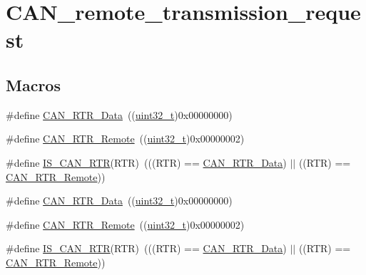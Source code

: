 \hypertarget{group___c_a_n__remote__transmission__request}{}\section{C\+A\+N\+\_\+remote\+\_\+transmission\+\_\+request}
\label{group___c_a_n__remote__transmission__request}
\subsection*{Macros}
\begin{DoxyCompactItemize}
\item 
\#define \hyperlink{group___c_a_n__remote__transmission__request_ga2407c3a8b2cd97bd651143aa959219f1}{C\+A\+N\+\_\+\+R\+T\+R\+\_\+\+Data}~((\hyperlink{_p_e___types_8h_a33594304e786b158f3fb30289278f5af}{uint32\+\_\+t})0x00000000)
\item 
\#define \hyperlink{group___c_a_n__remote__transmission__request_ga42e95ddfb02d88c82de84058fb0fb349}{C\+A\+N\+\_\+\+R\+T\+R\+\_\+\+Remote}~((\hyperlink{_p_e___types_8h_a33594304e786b158f3fb30289278f5af}{uint32\+\_\+t})0x00000002)
\item 
\#define \hyperlink{group___c_a_n__remote__transmission__request_ga3379997ad4da6fc4d7975c52b891bdc0}{I\+S\+\_\+\+C\+A\+N\+\_\+\+R\+TR}(R\+TR)~(((R\+TR) == \hyperlink{group___c_a_n__remote__transmission__request_ga2407c3a8b2cd97bd651143aa959219f1}{C\+A\+N\+\_\+\+R\+T\+R\+\_\+\+Data}) $\vert$$\vert$ ((R\+TR) == \hyperlink{group___c_a_n__remote__transmission__request_ga42e95ddfb02d88c82de84058fb0fb349}{C\+A\+N\+\_\+\+R\+T\+R\+\_\+\+Remote}))
\item 
\#define \hyperlink{group___c_a_n__remote__transmission__request_ga2407c3a8b2cd97bd651143aa959219f1}{C\+A\+N\+\_\+\+R\+T\+R\+\_\+\+Data}~((\hyperlink{_p_e___types_8h_a33594304e786b158f3fb30289278f5af}{uint32\+\_\+t})0x00000000)
\item 
\#define \hyperlink{group___c_a_n__remote__transmission__request_ga42e95ddfb02d88c82de84058fb0fb349}{C\+A\+N\+\_\+\+R\+T\+R\+\_\+\+Remote}~((\hyperlink{_p_e___types_8h_a33594304e786b158f3fb30289278f5af}{uint32\+\_\+t})0x00000002)
\item 
\#define \hyperlink{group___c_a_n__remote__transmission__request_ga3379997ad4da6fc4d7975c52b891bdc0}{I\+S\+\_\+\+C\+A\+N\+\_\+\+R\+TR}(R\+TR)~(((R\+TR) == \hyperlink{group___c_a_n__remote__transmission__request_ga2407c3a8b2cd97bd651143aa959219f1}{C\+A\+N\+\_\+\+R\+T\+R\+\_\+\+Data}) $\vert$$\vert$ ((R\+TR) == \hyperlink{group___c_a_n__remote__transmission__request_ga42e95ddfb02d88c82de84058fb0fb349}{C\+A\+N\+\_\+\+R\+T\+R\+\_\+\+Remote}))
\end{DoxyCompactItemize}


